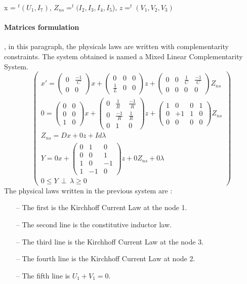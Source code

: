 x = $^{t}(U_{1},I_{7})$,
$Z_{ns}=^{t}(I_{2},I_{3},I_{4},I_{5}$),
$z = ^{t}(V_{1},V_{2},V_{3})$
\paragraph{Matrices formulation}, in this paragraph, the physicals laws are written with
complementarity constraints. The system obtained is named a Mixed Linear Complementarity System.
\[
\left(\begin{array}{c}
  
x'=\left(\begin{array}{cc}
0 &\frac{-1}{C}\\
0&0\end{array} \right)x
+\left(\begin{array}{ccc}
0&0&0\\
\frac{1}{L}&0&0\end{array} \right)z
+\left(\begin{array}{cccc}
0&0&\frac{1}{C}&\frac{-1}{C}\\
0&0&0&0\end{array} \right)Z_{ns}
\\
0=\left(\begin{array}{cc}
0 &0\\
0 &0\\
1 &0\end{array} \right)x
+\left(\begin{array}{ccc}
0&\frac{1}{R}&\frac{-1}{R}\\
0&\frac{-1}{R}&\frac{1}{R}\\
0&1&0\end{array} \right)z
+\left(\begin{array}{cccc}
1&0&0&1\\
0&+1&1&0\\
0&0&0&0\end{array} \right)Z_{ns}
\\
Z_{ns}=Dx+0z+Id\lambda\\
Y=0x+
\left(\begin{array}{ccc}
0&1&0\\
0&0&1\\
1&0&-1\\
1&-1&0\end{array}
\right) z + 0Z_{ns} +0\lambda\\

0 \leq Y \, \perp \, \lambda \geq 0

\end{array}
\right)
\]
The physical laws written in the previous system are :
\begin{itemize}
\item[--] The first is the Kirchhoff Current Law  at the node 1.
\item[--] The second line is the constitutive inductor law.
\item[--] The third line is the Kirchhoff Current Law at the node 3.
\item[--] The fourth line is the Kirchhoff Current Law at node 2.
\item[--] The fifth line is $U_1 + V_1=0$.
\end{itemize}


